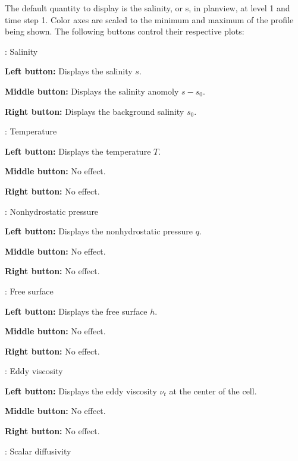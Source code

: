 \documentclass[12pt,oneside]{article}
\begin{document}
The default quantity to display is the salinity, or s, in planview, at level 1 and time step 1.  Color axes
are scaled to the minimum and maximum of the profile being shown.  The following
buttons control their respective plots:
\begin{list}{}
\item {}: Salinity
\begin{list}{}
\item {\bf Left button:} Displays the salinity $s$.
\item {\bf Middle button:} Displays the salinity anomoly $s-s_0$.
\item {\bf Right button:} Displays the background salinity $s_0$.
\end{list}
\item {}: Temperature
\begin{list}{}
\item {\bf Left button:} Displays the temperature $T$.
\item {\bf Middle button:} No effect.
\item {\bf Right button:} No effect.
\end{list}
\item {}: Nonhydrostatic pressure
\begin{list}{}
\item {\bf Left button:} Displays the nonhydrostatic pressure $q$.
\item {\bf Middle button:} No effect.
\item {\bf Right button:} No effect.
\end{list}
\item {}: Free surface
\begin{list}{}
\item {\bf Left button:} Displays the free surface $h$.
\item {\bf Middle button:} No effect.
\item {\bf Right button:} No effect.
\end{list}
\item {}:  Eddy viscosity 
\begin{list}{}
\item {\bf Left button:} Displays the eddy viscosity $\nu_t$ at the center of the cell.
\item {\bf Middle button:} No effect.
\item {\bf Right button:} No effect.
\end{list}
\item {}: Scalar diffusivity

\end{list}
\end{document}
